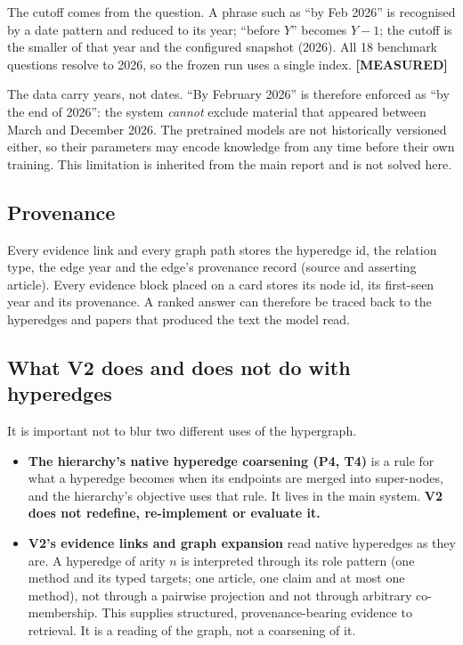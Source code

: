 \documentclass[11pt,a4paper]{article}
\theoremstyle{remark}
\newcommand{\vtag}[2]{{\sffamily\scriptsize\bfseries\textcolor{#1}{[#2]}}}
\newcommand{\Mtag}{\vtag{measgreen}{MEASURED}}
\begin{document}
The cutoff comes from the question. A phrase such as ``by Feb 2026'' is recognised by a
date pattern and reduced to its year; ``before $Y$'' becomes $Y-1$; the cutoff is the
smaller of that year and the configured snapshot (2026). All 18 benchmark questions
resolve to 2026, so the frozen run uses a single index. \Mtag

\begin{cautionbox}
The data carry years, not dates. ``By February 2026'' is therefore enforced as ``by the
end of 2026'': the system \emph{cannot} exclude material that appeared between March and
December 2026. The pretrained models are not historically versioned either, so their
parameters may encode knowledge from any time before their own training. This limitation
is inherited from the main report and is not solved here.
\end{cautionbox}

\subsection{Provenance}

Every evidence link and every graph path stores the hyperedge id, the relation type, the
edge year and the edge's provenance record (source and asserting article). Every evidence
block placed on a card stores its node id, its first-seen year and its provenance. A
ranked answer can therefore be traced back to the hyperedges and papers that produced the
text the model read.

\subsection{What V2 does and does not do with hyperedges}

It is important not to blur two different uses of the hypergraph.

\begin{itemize}
  \item \textbf{The hierarchy's native hyperedge coarsening (P4, T4)} is a rule for what a
        hyperedge becomes when its endpoints are merged into super-nodes, and the
        hierarchy's objective uses that rule. It lives in the main system. \textbf{V2 does
        not redefine, re-implement or evaluate it.}
  \item \textbf{V2's evidence links and graph expansion} read native hyperedges as they
        are. A hyperedge of arity $n$ is interpreted through its role pattern (one method
        and its typed targets; one article, one claim and at most one method), not through
        a pairwise projection and not through arbitrary co-membership. This supplies
        structured, provenance-bearing evidence to retrieval. It is a reading of the
        graph, not a coarsening of it.
\end{itemize}
\end{document}
